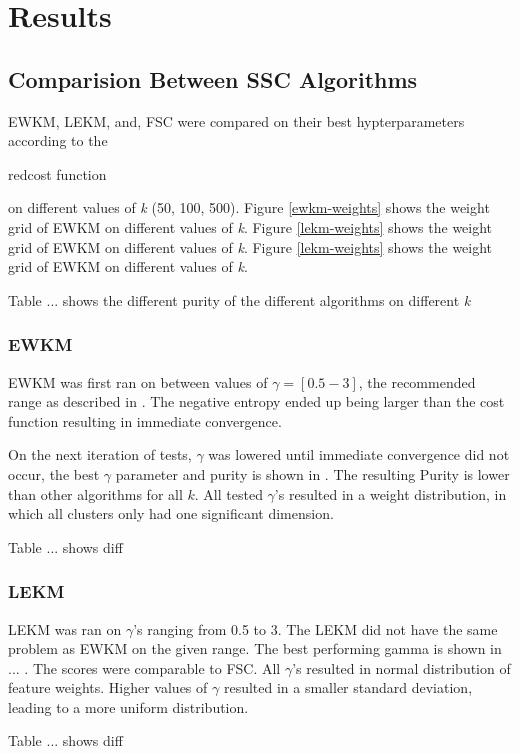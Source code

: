 \documentclass[../report.tex]{subfiles}
\begin{document}
\chapter{Results}

\section{Comparision Between SSC Algorithms}
EWKM, LEKM, and, FSC were compared on their best hypterparameters according to the \begin{color}{red}cost function\end{color} on different values of \textit{k} (50, 100, 500). Figure \ref{ewkm-weights} shows the weight grid of EWKM on different values of \textit{k}. Figure \ref{lekm-weights} shows the weight grid of EWKM on different values of \textit{k}. Figure \ref{lekm-weights} shows the weight grid of EWKM on different values of \textit{k}.

Table ... shows the different purity of the different algorithms on different \textit{k}

\subsection{EWKM}
EWKM was first ran on between values of $\gamma = [0.5-3]$, the recommended range as described in \cite{Jing2007, wskm2014hz}. The negative entropy ended up being larger than the cost function resulting in immediate convergence.

On the next iteration of tests, $\gamma$ was lowered until immediate convergence did not occur, the best $\gamma$ parameter and purity is shown in . The resulting Purity is lower than other algorithms for all $k$. All tested $\gamma$'s resulted in a weight distribution, in which all clusters only had one significant dimension.

Table ... shows diff

\subsection{LEKM}
LEKM was ran on $\gamma$'s ranging from 0.5 to 3. The LEKM did not have the same problem as EWKM on the given range. The best performing gamma is shown in ... . The scores were comparable to FSC. All $\gamma$'s resulted in normal distribution of feature weights. Higher values of $\gamma$ resulted in a smaller standard deviation, leading to a more uniform distribution.


Table ... shows diff
\end{document}
